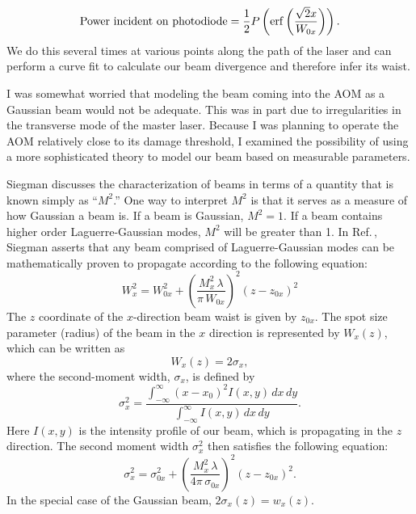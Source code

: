 \begin{equation}
{\rm Power\ incident\ on\ photodiode}=\frac{1}{2} P \left(\erf \left( \frac{\sqrt{2} x}{W_{0x}}\right)\right).
\end{equation}
We do this several times at various points along the path of the laser and can perform a curve fit to calculate our beam divergence and therefore infer its waist. 

I was somewhat worried that modeling the beam coming into the AOM as a Gaussian beam would not be adequate. This was in part due to irregularities in the transverse mode of the master laser.
Because I was planning to operate the AOM relatively close to its damage threshold, I examined the possibility of using a more sophisticated theory to model our beam based on measurable parameters. 

Siegman \cite{SiegmanBeamQuality} discusses the characterization of beams in terms of a quantity that is known simply as ``$M^2$.'' One way to interpret $M^2$ is that it serves as a measure of how Gaussian a beam is. If a beam is Gaussian, $M^2=1$. If a beam contains higher order Laguerre-Gaussian modes, $M^2$ will be greater than 1. In Ref.\,\cite{SiegmanBeamQuality}, Siegman asserts that any beam comprised of Laguerre-Gaussian modes can be mathematically proven to propagate according to the following equation:
\begin{equation}
W_x^2=W_{0x}^2+\left( \frac{M_x^2 \,\lambda}{\pi \, W_{0x}}\right)^2 (z-z_{0x})^2 \label{SiegmanBeamPropagate01}
\end{equation}
The $z$ coordinate of the $x$-direction beam waist is given by $z_{0x}$. The spot size parameter (radius) of the beam in the $x$ direction is represented by $W_x(z)$, which can be written as  
\begin{equation}
W_x(z)=2 \sigma_x,
\end{equation}
where the second-moment width, $\sigma_x$, is defined by 
\begin{equation}\label{secondMomentWidth}
\sigma_x^2=\frac{\int_{-\infty}^{\infty} (x-x_0)^2 I(x,y)\, dx\, dy}{\int_{-\infty}^{\infty} I(x,y)\, dx \, dy}.
\end{equation} 
Here $I(x,y)$ is the intensity profile of our beam, which is propagating in the $z$ direction. 
The second moment width $\sigma_x^2$ then satisfies the following equation:  
\begin{equation}
\sigma_x^2=\sigma_{0x}^2+\left( \frac{M_x^2 \,\lambda}{4 \pi \, \sigma_{0x}}\right)^2 (z-z_{0x})^2 \label{SiegmanBeamPropagate00}.
\end{equation}
In the special case of the Gaussian beam, $2\sigma_x(z)=w_x(z)$.

